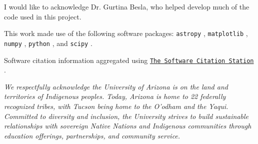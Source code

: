 \documentclass[trackchanges, twocolumn]{aastex7}
\begin{document}
I would like to acknowledge Dr. Gurtina Besla, who helped develop much of the code used in this project.

This work made use of the following software packages: \texttt{astropy} \citep{astropy:2013, astropy:2018, astropy:2022}, \texttt{matplotlib} \citep{Hunter:2007}, \texttt{numpy} \citep{numpy}, \texttt{python} \citep{python}, and \texttt{scipy} \citep{2020SciPy-NMeth, scipy_15366870}.

Software citation information aggregated using \texttt{\href{https://www.tomwagg.com/software-citation-station/}{The Software Citation Station}} \citep{software-citation-station-paper, software-citation-station-zenodo}.

\textit{We respectfully acknowledge the University of Arizona is on the land and territories of Indigenous peoples. Today, Arizona is home to 22 federally recognized tribes, with Tucson being home to the O’odham and the Yaqui. Committed to diversity and inclusion, the University strives to build sustainable relationships with sovereign Native Nations and Indigenous communities through education offerings, partnerships, and community service.}

{}

\end{document}
